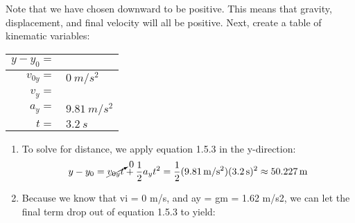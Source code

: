 \begin{mdframed}[backgroundcolor=blue!10!white]
	
	\vspace{0.1 in}
	Note that we have chosen downward to be positive.  This means that gravity, displacement, and final velocity will all be positive.  Next, create a table of kinematic variables:
	
	\begin{center}
		\begin{tabular}{| r  l |}
			\hline
			$y-y_0 =$ & \\
			\hline
			$v_{0y} = $ & $\SI{0}{m/s^2}$ \\
			\hline
			$v_y = $ & \\
			\hline
			$a_y = $ & $\SI{9.81}{m/s^2}$ \\
			\hline
			$t = $ &$\SI{3.2}{s}$ \\
			\hline
		\end{tabular}
	\end{center}
	
	
	
	\begin{enumerate}[label=\alph*.]
		
		
		\item To solve for distance, we apply equation 1.5.3 in the y-direction:
		\begin{equation*}
		y-y_0 = \cancelto{0}{v_{0y}t} + \frac{1}{2}a_yt^2 = \frac{1}{2}(\SI{9.81}{m/s^2})(\SI{3.2}{s})^2 \approx \SI{50.227}{m}
		\end{equation*}
		
		\item Because we know that vi = 0 m/s, and ay = gm = 1.62 m/s2, we can let the final term drop out of equation 1.5.3 to yield:
	\end{enumerate}
\end{mdframed}




